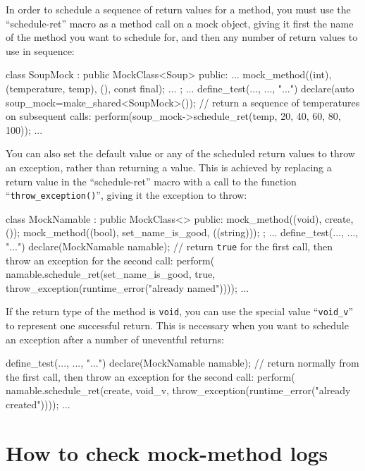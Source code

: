 \documentclass[twoside, a4paper, article]{memoir}
\begin{document}
In order to schedule a sequence of return values for a method, you must use the
``schedule-ret'' macro as a method call on a mock object, giving it first the
name of the method you want to schedule for, and then any number of return
values to use in sequence:
\begin{cpplisting}
class SoupMock
  : public MockClass<Soup> {
public:
  ...
  mock_method((int), (temperature, temp), (), const final);
  ...
};
...
define_test(..., ..., "...") {
  declare(auto soup_mock=make_shared<SoupMock>());
  // return a sequence of temperatures on subsequent calls:
  perform(soup_mock->schedule_ret(temp,
                                  20, 40, 60, 80, 100));
  ...
}
\end{cpplisting}

You can also set the default value or any of the scheduled return values to
throw an exception, rather than returning a value.  This is achieved by
replacing a return value in the ``schedule-ret'' macro with a call to the
function ``\texttt{throw\_exception()}'', giving it the exception to throw:
\begin{cpplisting}
class MockNamable
  : public MockClass<> {
public:
  mock_method((void), create, ());
  mock_method((bool), set_name_is_good, ((string)));
};
...
define_test(..., ..., "...") {
  declare(MockNamable namable);
  // return \texttt{true} for the first call, then throw an exception for the %
     second call:
  perform(
    namable.schedule_ret(set_name_is_good,
      true,
      throw_exception(runtime_error("already named"))));
  ...
}
\end{cpplisting}

If the return type of the method is \texttt{void}, you can use the special
value ``\texttt{void\_v}'' to represent one successful return.  This is
necessary when you want to schedule an exception after a number of uneventful
returns:
\begin{cpplisting}
define_test(..., ..., "...") {
  declare(MockNamable namable);
  // return normally from the first call, then throw an exception for the %
     second call:
  perform(
    namable.schedule_ret(create,
      void_v,
      throw_exception(runtime_error("already created"))));
  ...
}

\end{cpplisting}

\section{How to check mock-method logs}
\label{sec:check-mock-method-logs}
\end{document}
